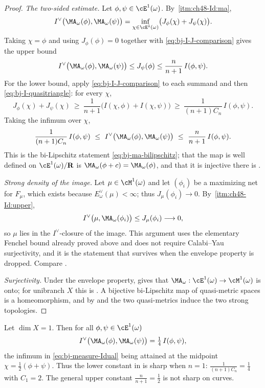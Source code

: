 \begin{proof}
\emph{The two-sided estimate.}  Let $\phi,\psi\in\cE^1(\omega)$.  By
\,\cref{itm:ch48-Id:ma},
\[
 I^\vee\bigl(\MA_\omega(\phi),\MA_\omega(\psi)\bigr)
 =\inf_{\chi\in\cE^1(\omega)}\bigl(J_\phi(\chi)+J_\psi(\chi)\bigr).
\]
Taking $\chi=\phi$ and using $J_\phi(\phi)=0$ together with
\eqref{eq:bj-I-J-comparison} gives the upper bound
\[
 I^\vee\bigl(\MA_\omega(\phi),\MA_\omega(\psi)\bigr)
 \le J_\psi(\phi)\le\frac n{n+1}\,I(\phi,\psi).
\]
For the lower bound, apply \eqref{eq:bj-I-J-comparison} to each summand and
then \eqref{eq:bj-I-quasitriangle}: for every $\chi$,
\[
 J_\phi(\chi)+J_\psi(\chi)
 \ \ge\ \frac1{n+1}\bigl(I(\chi,\phi)+I(\chi,\psi)\bigr)
 \ \ge\ \frac1{(n+1)C_n}\,I(\phi,\psi).
\]
Taking the infimum over $\chi$,
\[
 \frac{1}{(n+1)C_n}\,I(\phi,\psi)
 \ \le\ I^\vee\bigl(\MA_\omega(\phi),\MA_\omega(\psi)\bigr)
 \ \le\ \frac n{n+1}\,I(\phi,\psi).
\]
This is the bi-Lipschitz statement \eqref{eq:bj-ma-bilipschitz}; that the
map is well defined on $\cE^1(\omega)/\mathbf R$ is
$\MA_\omega(\phi+c)=\MA_\omega(\phi)$, and that it is injective there is
.

\emph{Strong density of the image.}  Let $\mu\in\cM^1(\omega)$ and let
$(\phi_i)$ be a maximizing net for $F_\mu$, which exists because
$E^\vee_\omega(\mu)<\infty$; thus $J_\mu(\phi_i)\to0$.  By
\,\cref{itm:ch48-Id:upper},
\[
 I^\vee\bigl(\mu,\MA_\omega(\phi_i)\bigr)\le J_\mu(\phi_i)
 \longrightarrow0 ,
\]
so $\mu$ lies in the $I^\vee$-closure of the image.  This argument uses the elementary Fenchel bound already proved above and does
not require Calabi--Yau surjectivity, and it is the statement that survives when the envelope property
is dropped.  Compare \cite[Corollary~10.13]{BJ22}.

\emph{Surjectivity.}  Under the envelope property,
 gives that
$\MA_\omega:\cE^1(\omega)\to\cM^1(\omega)$ is onto; for unibranch $X$
this is .  A bijective bi-Lipschitz map of
quasi-metric spaces is a homeomorphism, and by
 and  the
two quasi-metrics induce the two strong topologies.
\end{proof}

\begin{proposition}
\label{prop:ch48-curve-Idual}
Let $\dim X=1$.  Then for all $\phi,\psi\in\cE^1(\omega)$
\[
 I^\vee\bigl(\MA_\omega(\phi),\MA_\omega(\psi)\bigr)
 =\tfrac14\,I(\phi,\psi),
\]
the infimum in \eqref{eq:bj-measure-Idual} being attained at the midpoint
$\chi=\tfrac12(\phi+\psi)$.  Thus the lower constant in
 is sharp when $n=1$:
$\frac1{(n+1)C_n}=\frac14$ with $C_1=2$.
The general upper constant $\frac n{n+1}=\frac12$ is not sharp
on curves.
\end{proposition}

